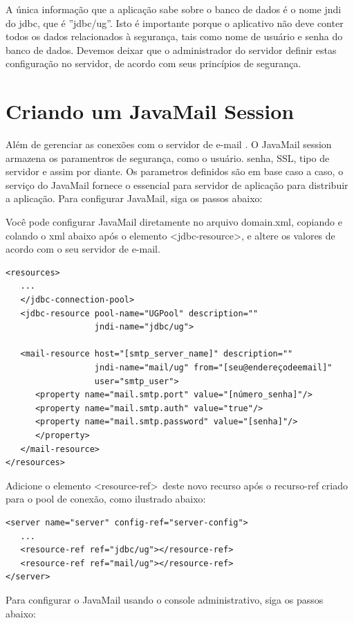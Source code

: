 \documentclass[envcountsame,envcountchap]{svmono}
\begin{document}
A única informação que a aplicação sabe sobre o banco de dados é o nome jndi do jdbc, que é ''jdbc/ug''. Isto é importante porque o aplicativo não deve conter todos os dados relacionados à segurança, tais como nome de usuário e senha do banco de dados. Devemos deixar que o administrador do servidor definir estas configuração no servidor, de acordo com seus princípios de segurança.

\section{Criando um JavaMail Session}

Além de gerenciar as conexões com o servidor de e-mail . O JavaMail session armazena os paramentros de segurança, como o usuário. senha, SSL, tipo de servidor e assim por diante. Os parametros definidos são em base caso a caso,  o serviço do JavaMail fornece o essencial para servidor de aplicação para distribuir a aplicação. Para configurar JavaMail, siga os passos abaixo:

Você pode configurar JavaMail diretamente no arquivo domain.xml, copiando e colando o xml abaixo após o elemento \textless jdbc-resource\textgreater, e altere os valores de acordo com o seu servidor de e-mail.

\begin{verbatim}
<resources>
   ...
   </jdbc-connection-pool>
   <jdbc-resource pool-name="UGPool" description=""
                  jndi-name="jdbc/ug">

   <mail-resource host="[smtp_server_name]" description="" 
                  jndi-name="mail/ug" from="[seu@endereçodeemail]"
                  user="smtp_user">
      <property name="mail.smtp.port" value="[número_senha]"/>
      <property name="mail.smtp.auth" value="true"/>
      <property name="mail.smtp.password" value="[senha]"/>
      </property>
   </mail-resource>
</resources>
\end{verbatim}

Adicione o elemento \textless resource-ref\textgreater \ deste novo recurso após o recurso-ref criado para o pool de conexão, como ilustrado abaixo:

\begin{verbatim}
<server name="server" config-ref="server-config">
   ...
   <resource-ref ref="jdbc/ug"></resource-ref>
   <resource-ref ref="mail/ug"></resource-ref>
</server>
\end{verbatim}

Para configurar o JavaMail usando o console administrativo, siga os passos abaixo:
\end{document}
